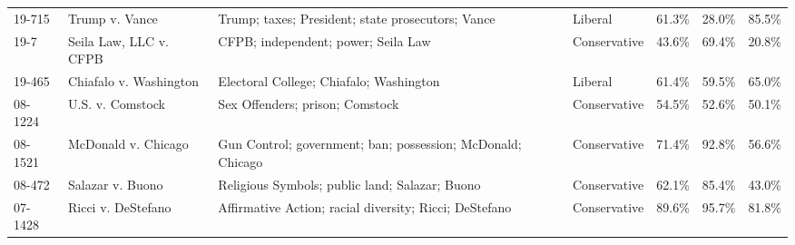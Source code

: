 {\begin{tabular}{@{}llllccc@{}}
19-715   & Trump v. Vance                                                                                                               & Trump; taxes; President; state prosecutors; Vance                                                                                            & Liberal                                     & 61.3\%                       & 28.0\%        & 85.5\%        \\
19-7     & Seila Law, LLC v. CFPB                                                                                                       & CFPB; independent; power; Seila Law                                                                                                          & Conservative                                & 43.6\%                       & 69.4\%        & 20.8\%        \\
19-465   & Chiafalo v. Washington                                                                                                       & Electoral College; Chiafalo; Washington                                                                                                      & Liberal                                     & 61.4\%                       & 59.5\%        & 65.0\%        \\
08-1224  & U.S. v. Comstock                                                                                                             & Sex Offenders; prison; Comstock                                                                                                              & Conservative                                & 54.5\%                       & 52.6\%        & 50.1\%        \\
08-1521  & McDonald v. Chicago                                                                                                          & Gun Control; government; ban; possession; McDonald; Chicago                                                                                  & Conservative                                & 71.4\%                       & 92.8\%        & 56.6\%        \\
08-472   & Salazar v. Buono                                                                                                             & Religious Symbols; public land; Salazar; Buono                                                                                               & Conservative                                & 62.1\%                       & 85.4\%        & 43.0\%        \\
07-1428  & Ricci v. DeStefano                                                                                                           & Affirmative Action; racial diversity; Ricci; DeStefano                                                                                       & Conservative                                & 89.6\%                       & 95.7\%        & 81.8\%        \\

\end{tabular}}
